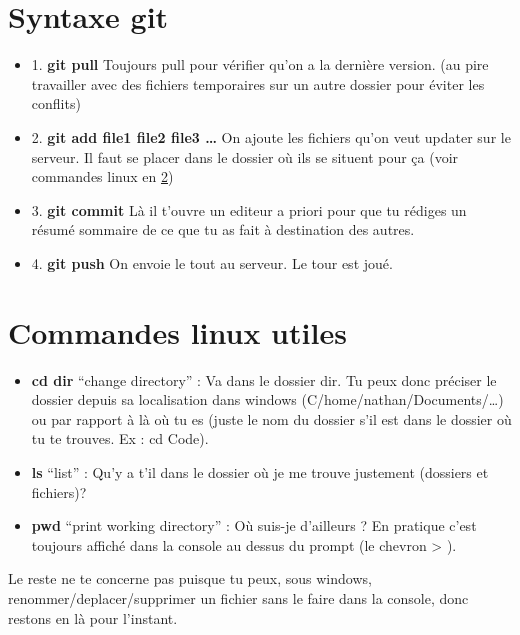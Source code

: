 \documentclass[a4paper,11pt,titlepage]{article}
\begin{document}
\section{Syntaxe git}
\begin{itemize}
	\item 1. \textbf{git pull} Toujours pull pour vérifier qu'on a la dernière version. (au pire travailler avec des fichiers temporaires sur un autre dossier pour éviter les conflits)
	\item 2. \textbf{git add file1 file2 file3 \dots} On ajoute les fichiers qu'on veut updater sur le serveur. Il faut se placer dans le dossier où ils se situent pour ça (voir commandes linux en \ref{linux})
	\item 3. \textbf{git commit} Là il t'ouvre un editeur a priori pour que tu rédiges un résumé sommaire de ce que tu as fait à destination des autres.
	\item 4. \textbf{git push} On envoie le tout au serveur. Le tour est joué.
\end{itemize}

\section{Commandes linux utiles}
\label{linux}
\begin{itemize}
	\item \textbf{cd dir} ``change directory'' : Va dans le dossier dir. Tu peux donc préciser le dossier depuis sa localisation dans windows (C/home/nathan/Documents/\dots) ou par rapport à là où tu es (juste le nom du dossier s'il est dans le dossier où tu te trouves. Ex : cd Code).
	\item \textbf{ls} ``list'' : Qu'y a t'il dans le dossier où je me trouve justement (dossiers et fichiers)?
	\item \textbf{pwd} ``print working directory'' : Où suis-je d'ailleurs ? En pratique c'est toujours affiché dans la console au dessus du prompt (le chevron > ).
\end{itemize}
Le reste ne te concerne pas puisque tu peux, sous windows, renommer/deplacer/supprimer un fichier sans le faire dans la console, donc restons en là pour l'instant.
\end{document}
